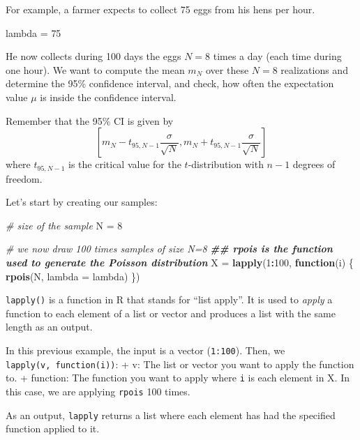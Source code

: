 \documentclass[
]{book}
\newenvironment{Shaded}{\begin{snugshade}}{\end{snugshade}}
\newcommand{\AttributeTok}[1]{\textcolor[rgb]{0.13,0.29,0.53}{#1}}
\newcommand{\CommentTok}[1]{\textcolor[rgb]{0.56,0.35,0.01}{\textit{#1}}}
\newcommand{\ControlFlowTok}[1]{\textcolor[rgb]{0.13,0.29,0.53}{\textbf{#1}}}
\newcommand{\DecValTok}[1]{\textcolor[rgb]{0.00,0.00,0.81}{#1}}
\newcommand{\DocumentationTok}[1]{\textcolor[rgb]{0.56,0.35,0.01}{\textbf{\textit{#1}}}}
\newcommand{\FunctionTok}[1]{\textcolor[rgb]{0.13,0.29,0.53}{\textbf{#1}}}
\newcommand{\NormalTok}[1]{#1}
\newcommand{\OtherTok}[1]{\textcolor[rgb]{0.56,0.35,0.01}{#1}}
\newcommand{\SpecialCharTok}[1]{\textcolor[rgb]{0.81,0.36,0.00}{\textbf{#1}}}
\begin{document}
For example, a farmer expects to collect 75 eggs from his hens per hour.

\begin{Shaded}
\begin{Highlighting}[]
\NormalTok{lambda }\OtherTok{=} \DecValTok{75}
\end{Highlighting}
\end{Shaded}

He now collects during 100 days the eggs \(N=8\) times a day (each time during one hour). We want to compute the mean \(m_N\) over these \(N=8\) realizations and determine the 95\% confidence interval, and check, how often the expectation value \(\mu\) is inside the confidence interval.

Remember that the 95\% CI is given by \[[m_N-t_{95,N-1}\frac{\sigma}{\sqrt{N}},m_N+t_{95,N-1}\frac{\sigma}{\sqrt{N}}]\] where \(t_{95,N-1}\) is the critical value for the \(t\)-distribution with \(n-1\) degrees of freedom.

Let's start by creating our samples:

\begin{Shaded}
\begin{Highlighting}[]
\CommentTok{\# size of the sample}
\NormalTok{N }\OtherTok{=} \DecValTok{8}

\CommentTok{\# we now draw 100 times samples of size N=8}
\DocumentationTok{\#\# rpois is the function used to generate the Poisson distribution}
\NormalTok{X }\OtherTok{=} \FunctionTok{lapply}\NormalTok{(}\DecValTok{1}\SpecialCharTok{:}\DecValTok{100}\NormalTok{, }\ControlFlowTok{function}\NormalTok{(i) \{}
  \FunctionTok{rpois}\NormalTok{(N, }\AttributeTok{lambda =}\NormalTok{ lambda)}
\NormalTok{  \})}
\end{Highlighting}
\end{Shaded}

\texttt{lapply()} is a function in R that stands for ``list apply''. It is used to \emph{apply} a function to each element of a list or vector and produces a list with the same length as an output.

In this previous example, the input is a vector (\texttt{1:100}).
Then, we \texttt{lapply(v,\ function(i))}:
+ v: The list or vector you want to apply the function to.
+ function: The function you want to apply where \texttt{i} is each element in X. In this case, we are applying \texttt{rpois} 100 times.

As an output, \texttt{lapply} returns a list where each element has had the specified function applied to it.
\end{document}

